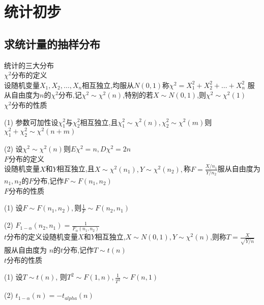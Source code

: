 \documentclass[12pt, a4paper, oneside, UTF8]{ctexbook}
\begin{document}
% 
\else
\fi

\chapter{统计初步}

\section{求统计量的抽样分布}
\begin{remark}
    统计的三大分布 \\
    $\chi^2$分布的定义\\ 
    设随机变量$X_1,X_2,\ldots,X_n$相互独立,均服从$N(0,1)$称$\chi^2=X_1^2+X_2^2+\ldots+X_n^2$
    服从自由度为$n$的$\chi^2$分布,记$\chi^2\sim\chi^2(n)$,特别的若$X\sim N(0,1)$,则$\chi^2\sim\chi^2(1)$ \\
    $\chi^2$分布的性质
    \item[(1)] 参数可加性\qquad 设$\chi_1^2$与$\chi_2^2$相互独立,且$\chi_1^2\sim\chi^2(n),\chi_2^2\sim\chi^2(m)$则
    $\chi_1^2+\chi_2^2\sim\chi^2(n+m)$
    \item[(2)] 设$\chi^2\sim\chi^2(n)$则$E\chi^2=n,D\chi^2=2n$ \\
    $F$分布的定义 \\
    设随机变量$X$和$Y$相互独立,且$X\sim \chi^2(n_1),Y\sim\chi^2(n_2),$称$F=\frac{X/n_1}{Y/n_2}$服从自由度为
    $n_1,n_2$的$F$分布,记作$F\sim F(n_1,n_2)$\\
    $F$分布的性质 
    \item[(1)] 设$F\sim F(n_1,n_2),$则$\frac{1}{F}\sim F(n_2,n_1)$
    \item[(2)] $F_{1-\alpha}(n_2,n_1)=\frac{1}{F_{\alpha}(n_1,n_2)}$ \\
    $t$分布的定义\qquad 设随机变量$X$和$Y$相互独立,$X\sim N(0,1),Y\sim \chi^2(n)$,则称$T=\frac{X}{\sqrt{Y/n}}$服从自由度为
    $n$的$t$分布,记作$T\sim t(n)$ \\
    $t$分布的性质
    \item[(1)] 设$T\sim t(n)$, 则$T^2\sim F(1, n),\frac{1}{T^2}\sim F(n,1)$ 
    \item[(2)] $t_{1-\alpha}(n)=-t_{alpha}(n)$ 
\end{remark}
\end{document}

